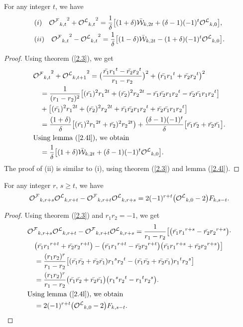 \begin{theorem} For any integer $t$, we have\label{2.12t}
\begin{align*}
&(i)\quad{{{\mathcal{O^F}}}_{k,t}}^2+{{{\mathcal{O^L}}}_{k,t}}^2=\frac{1}{\delta}\big[(1+\delta)\bar{\mathcal{W}}_{k,2t}+(\delta-1)(-1)^t{{\mathcal{O^L}}}_{k,0}\big],\\
&(ii)\quad{{{\mathcal{O^F}}}_{k,t}}^2-{{{\mathcal{O^L}}}_{k,t}}^2=\frac{1}{\delta}\big[(1-\delta)\bar{\mathcal{W}}_{k,2t}-(1+\delta)(-1)^t{{\mathcal{O^L}}}_{k,0}\big].
\end{align*}
\end{theorem}
\begin{proof}
Using theorem (\ref{2.3}), we get
\begin{align*}
&{{{\mathcal{O^F}}}_{k,t}}^2+{{{\mathcal{O^L}}}_{k,t+1}}^2=\big(\dfrac{\bar{r_1}{{r_1}}^{t}-\bar{r_2}{r_{2}}^{t}}{r_1-r_2}\big)^2+\big(\bar{r_1}{{r_1}}^{t}+\bar{r_2}{r_{2}}^{t}\big)^2\\
&\quad =\frac{1}{(r_1-r_2)^2}\big[(\bar{r_1})^2{r_1}^{2t}+(\bar{r_2})^2{r_2}^{2t}-\bar{r_1}\bar{r_2}{r_1r_2}^{t}-\bar{r_2}\bar{r_1}{r_1r_2}^{t}\big]\\&\quad +\big[(\bar{r_1})^2{r_1}^{2t}+(\bar{r_2})^2{r_2}^{2t}+\bar{r_1}\bar{r_2}{r_1r_2}^{t}+\bar{r_2}\bar{r_1}{r_1r_2}^{t}\big]\\
&\quad = \frac{(1+\delta)}{\delta}\big[(\bar{r_1})^2{r_1}^{2t}+\bar{r_2})^2{r_2}^{2t}\big)+\frac{(\delta-1)(-1)^t}{\delta}\big[\bar{r_1}\bar{r_2}+\bar{r_2}\bar{r_1}\big].\\
&\text{Using lemma (\ref{2.4l}), we obtain}\\
&\quad =\frac{1}{\delta}\big[(1+\delta)\bar{\mathcal{W}}_{k,2t}+(\delta-1)(-1)^t{{\mathcal{O^L}}}_{k,0}\big].
\end{align*}
The proof of (ii) is similar to (i), using theorem (\ref{2.3}) and lemma (\ref{2.4l}).
\end{proof}
\begin{theorem} For any integer $r$, $s\geq t$,  we have\label{2.13t}
\begin{align*}
{{\mathcal{O^F}}}_{k, r+s}{{\mathcal{O^L}}}_{k,r+t}-{{\mathcal{O^F}}}_{k,r+t}{{\mathcal{O^L}}}_{k,r+s}=2(-1)^{r+t}\big({{\mathcal{O^L}}}_{k,0}-2\big)F_{k,s-t}.
\end{align*}
\end{theorem}
\begin{proof}
Using theorem (\ref{2.3}) and $r_1r_2=-1$, we get
\begin{align*}
&{{\mathcal{O^F}}}_{k, r+s}{{\mathcal{O^L}}}_{k,r+t}-{{\mathcal{O^F}}}_{k,r+t}{{\mathcal{O^L}}}_{k,r+s}=\dfrac{1}{r_1-r_2}\big[\big(\bar{r_1}{r_1}^{r+s}-\bar{r_2}{r_2}^{r+s}\big)\cdot\\&\quad\big(\bar{r_1}{r_1}^{r+t}+\bar{r_2}{r_2}^{r+t}\big)-\big(\bar{r_1}{r_1}^{r+t}-\bar{r_2}{r_2}^{r+t}\big)\big(\bar{r_1}{r_1}^{r+s}+\bar{r_2}{r_2}^{r+s}\big)\big]\\
&\quad=\frac{(r_1r_2)^r}{r_1-r_2}\big[(\bar{r_1}\bar{r_2}+\bar{r_2}\bar{r_1}){r_1}^s{r_2}^t-(\bar{r_1}\bar{r_2}+\bar{r_2}\bar{r_1}){r_1}^t{r_2}^s\big]\\
&\quad=\dfrac{(r_1r_2)^r}{r_1-r_2}\big(\bar{r_1}\bar{r_2}+\bar{r_2}\bar{r_1}\big)\big({r_1}^s{r_2}^t-{r_1}^t{r_2}^s\big).\\
&\text{Using lemma (\ref{2.4l}), we obtain}\\
&\quad =2(-1)^{r+t}\big({{\mathcal{O^L}}}_{k,0}-2\big)F_{k,s-t}.
\end{align*}
\end{proof}
